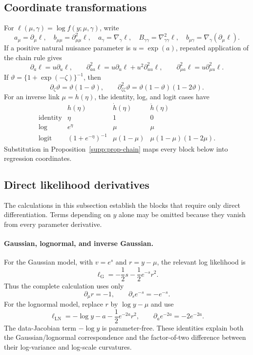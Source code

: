 \documentclass[a4paper,fleqn]{cas-sc}
\numberwithin{equation}{section}
\begin{document}
\subsection{Coordinate transformations}

For $\ell(\mu,\gamma)=\log f(y;\mu,\gamma)$, write
\[
 a_\mu=\partial_\mu\ell,\quad b_{\mu\mu}=\partial_{\mu\mu}^2\ell,\quad
 a_\gamma=\nabla_\gamma\ell,\quad
 B_{\gamma\gamma}=\nabla_{\gamma\gamma}^2\ell,\quad
 b_{\mu\gamma}=\nabla_\gamma(\partial_\mu\ell).
\]
If a positive natural nuisance parameter is $u=\exp(a)$, repeated application of the chain rule gives
\begin{equation}
 \partial_a\ell=u\partial_u\ell,\qquad
 \partial_{aa}^2\ell=u\partial_u\ell+u^2\partial_{uu}^2\ell,\qquad
 \partial_{\mu a}^2\ell=u\partial_{\mu u}^2\ell.
 \label{supp:eq:log-transform}
\end{equation}
If $\vartheta=\{1+\exp(-\zeta)\}^{-1}$, then
\begin{equation}
 \partial_\zeta\vartheta=\vartheta(1-\vartheta),\qquad
 \partial_{\zeta\zeta}^2\vartheta
 =\vartheta(1-\vartheta)(1-2\vartheta).
 \label{supp:eq:logit-transform}
\end{equation}
For an inverse link $\mu=h(\eta)$, the identity, log, and logit cases have
\[
\begin{array}{c|ccc}
 &h(\eta)&\dot h(\eta)&\ddot h(\eta)\\ \hline
\text{identity}&\eta&1&0\\
\text{log}&e^\eta&\mu&\mu\\
\text{logit}&(1+e^{-\eta})^{-1}&\mu(1-\mu)&\mu(1-\mu)(1-2\mu).
\end{array}
\]
Substitution in Proposition~\ref{supp:prop-chain} maps every block below into regression coordinates.

\subsection{Direct likelihood derivatives}

The calculations in this subsection establish the blocks that require only direct differentiation. Terms depending on $y$ alone may be omitted because they vanish from every parameter derivative.

\paragraph{Gaussian, lognormal, and inverse Gaussian.}
For the Gaussian model, with $v=e^s$ and $r=y-\mu$, the relevant log likelihood is
\[
 \ell_{\mathrm G}=-\frac12s-\frac12e^{-s}r^2.
\]
Thus the complete calculation uses only
\[
 \partial_\mu r=-1,\qquad
 \partial_s e^{-s}=-e^{-s}.
\]
For the lognormal model, replace $r$ by $\log y-\mu$ and use
\[
 \ell_{\mathrm{LN}}=-\log y-a-\frac12e^{-2a}r^2,
 \qquad \partial_a e^{-2a}=-2e^{-2a}.
\]
The data-Jacobian term $-\log y$ is parameter-free. These identities explain both the Gaussian/lognormal correspondence and the factor-of-two difference between their log-variance and log-scale curvatures.
\end{document}
